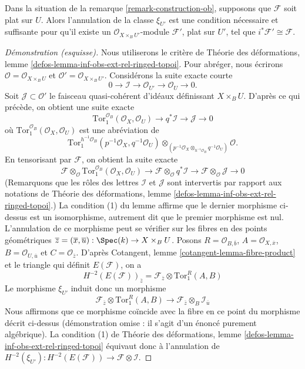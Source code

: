 \begin{lemma}
\label{lemma-ob-is-obstruction}
Dans la situation de la remarque \ref{remark-construction-ob}, supposons que
$\mathcal{F}$ soit plat sur $U$. Alors l'annulation de la classe $\xi_{U'}$
est une condition nécessaire et suffisante pour qu'il existe un
$\mathcal{O}_{X \times_B U'}$-module $\mathcal{F}'$, plat sur $U'$, tel que
$i^*\mathcal{F}' \cong \mathcal{F}$.
\end{lemma}

\begin{proof}[Démonstration (esquisse)]
Nous utiliserons le critère de
Théorie des déformations, lemme \ref{defos-lemma-inf-obs-ext-rel-ringed-topoi}.
Pour abréger, nous écrirons
$\mathcal{O} = \mathcal{O}_{X \times_B U}$ et
$\mathcal{O}' = \mathcal{O}_{X \times_B U'}$.
Considérons la suite exacte courte
$$
0 \to \mathcal{I} \to \mathcal{O}_{U'} \to \mathcal{O}_U \to 0.
$$
Soit $\mathcal{J} \subset \mathcal{O}'$ le faisceau quasi-cohérent d'idéaux
définissant $X \times_B U$. D'après ce qui précède, on obtient une suite exacte
$$
\text{Tor}_1^{\mathcal{O}_B}(\mathcal{O}_X, \mathcal{O}_U) \to
q^*\mathcal{I} \to \mathcal{J} \to 0
$$
où $\text{Tor}_1^{\mathcal{O}_B}(\mathcal{O}_X, \mathcal{O}_U)$ est une
abréviation de
$$
\text{Tor}_1^{h^{-1}\mathcal{O}_B}(p^{-1}\mathcal{O}_X, q^{-1}\mathcal{O}_U)
\otimes_{(p^{-1}\mathcal{O}_X\otimes_{h^{-1}\mathcal{O}_B}q^{-1}\mathcal{O}_U)}
\mathcal{O}.
$$
En tensorisant par $\mathcal{F}$, on obtient la suite exacte
$$
\mathcal{F} \otimes_\mathcal{O}
\text{Tor}_1^{\mathcal{O}_B}(\mathcal{O}_X, \mathcal{O}_U) \to
\mathcal{F} \otimes_\mathcal{O}
q^*\mathcal{I} \to
\mathcal{F} \otimes_\mathcal{O} \mathcal{J} \to 0
$$
(Remarquons que les rôles des lettres $\mathcal{I}$ et $\mathcal{J}$ sont
intervertis par rapport aux notations de
Théorie des déformations, lemme \ref{defos-lemma-inf-obs-ext-rel-ringed-topoi}.)
La condition (1) du lemme affirme que le dernier morphisme ci-dessus est un
isomorphisme, autrement dit que le premier morphisme est nul.
L'annulation de ce morphisme peut se vérifier sur les fibres en des points géométriques
$\overline{z} = (\overline{x}, \overline{u}) : \Spec(k) \to X \times_B U$.
Posons $R = \mathcal{O}_{B, \overline{b}}$,
$A = \mathcal{O}_{X, \overline{x}}$,
$B = \mathcal{O}_{U, \overline{u}}$ et
$C = \mathcal{O}_{\overline{z}}$.
D'après Cotangent, lemme \ref{cotangent-lemma-fibre-product}
et le triangle qui définit $E(\mathcal{F})$, on a
$$
H^{-2}(E(\mathcal{F}))_{\overline{z}} =
\mathcal{F}_{\overline{z}} \otimes \text{Tor}_1^R(A, B)
$$
Le morphisme $\xi_{U'}$ induit donc un morphisme
$$
\mathcal{F}_{\overline{z}} \otimes \text{Tor}_1^R(A, B)
\longrightarrow
\mathcal{F}_{\overline{z}} \otimes_B \mathcal{I}_{\overline{u}}
$$
Nous affirmons que ce morphisme coïncide avec la fibre en ce point du
morphisme décrit ci-dessus (démonstration omise : il s'agit d'un énoncé
purement algébrique). La condition (1) de
Théorie des déformations, lemme \ref{defos-lemma-inf-obs-ext-rel-ringed-topoi}
équivaut donc à l'annulation de
$H^{-2}(\xi_{U'}) :
H^{-2}(E(\mathcal{F})) \to \mathcal{F} \otimes \mathcal{I}$.


\end{proof}
